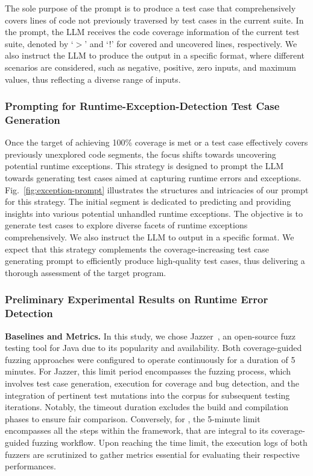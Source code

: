The sole purpose of the prompt is to produce a test case that
comprehensively covers lines of code not previously traversed by test
cases in the current suite. In the prompt, the LLM receives the code
coverage information of the current test suite, denoted by `$>$' and
`!' for covered and uncovered lines, respectively. We
also instruct the LLM to produce the output in a specific format,
where different scenarios are considered, such as negative,
positive, zero inputs, and maximum values, thus reflecting a
diverse range of inputs.

\subsubsection*{Prompting for Runtime-Exception-Detection Test Case Generation}

Once the target of achieving 100\% coverage is met or a test case
effectively covers previously unexplored code segments, the focus
shifts towards uncovering potential runtime exceptions.
%
This strategy is designed to prompt the LLM towards generating test
cases aimed at capturing runtime errors and
exceptions. Fig.~\ref{fig:exception-prompt} illustrates the structures
and intricacies of our prompt for this strategy. The initial segment
is dedicated to predicting and providing insights into various
potential unhandled runtime exceptions. The objective is to generate
test cases to explore diverse facets of runtime exceptions
comprehensively. We also instruct the LLM to output in a specific
format. We expect that this strategy complements the
coverage-increasing test case generating prompt to efficiently produce
high-quality test cases, thus delivering a thorough assessment of the
target program.

\subsubsection*{Preliminary Experimental Results on Runtime Error Detection}
\label{sec:rq1}


{\bf Baselines and Metrics.} In this study, we chose Jazzer~\cite{jazzer}, an
open-source fuzz testing tool for Java due to its popularity and
availability.
%
Both coverage-guided fuzzing approaches were configured to operate
continuously for a duration of 5 minutes. For Jazzer, this limit
period encompasses the fuzzing process, which involves test case
generation, execution for coverage and bug detection, and the
integration of pertinent test mutations into the corpus for subsequent
testing iterations. Notably, the timeout duration excludes the build
and compilation phases to ensure fair comparison.  Conversely, for
{\tool}, the 5-minute limit encompasses all the steps within the
framework, that are
integral to its coverage-guided fuzzing workflow. Upon
reaching the time limit, the execution logs of both fuzzers are
scrutinized to gather metrics essential for evaluating their
respective performances.

